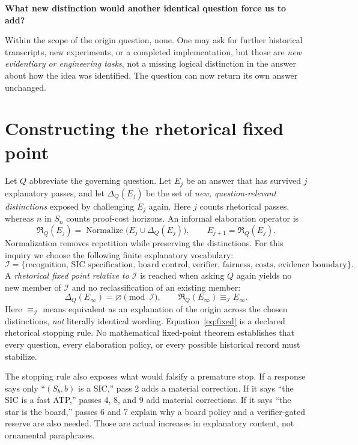 \documentclass[11pt,letterpaper]{article}
\newcommand{\qline}[2]{\medskip\noindent{\color{accent}\textbf{Pass #1.}}\quad\textbf{#2}\par}
\begin{document}
\qline{12}{What new distinction would another identical question force us to add?}
Within the scope of the origin question, none. One may ask for further historical transcripts, new experiments, or a completed implementation, but those are \emph{new evidentiary or engineering tasks}, not a missing logical distinction in the answer about how the idea was identified. The question can now return its own answer unchanged.

\section{Constructing the rhetorical fixed point}
Let $Q$ abbreviate the governing question. Let $E_j$ be an answer that has survived $j$ explanatory passes, and let $\Delta_Q(E_j)$ be the set of \emph{new, question-relevant distinctions} exposed by challenging $E_j$ again. Here $j$ counts rhetorical passes, whereas $n$ in $S_n$ counts proof-cost horizons. An informal elaboration operator is
\begin{equation}\label{eq:operator}
\mathfrak R_Q(E_j)=\operatorname{Normalize}\bigl(E_j\cup\Delta_Q(E_j)\bigr),
\qquad E_{j+1}=\mathfrak R_Q(E_j).
\end{equation}
Normalization removes repetition while preserving the distinctions. For this inquiry we choose the following finite explanatory vocabulary:
\[
\mathcal I=\{\text{recognition, SIC specification, board control,}\
\text{verifier, fairness, costs, evidence boundary}\}.
\]
A \emph{rhetorical fixed point relative to $\mathcal I$} is reached when asking $Q$ again yields no new member of $\mathcal I$ and no reclassification of an existing member:
\begin{equation}\label{eq:fixed}
\boxed{\Delta_Q(E_{\infty})=\varnothing\pmod{\mathcal I},\qquad
\mathfrak R_Q(E_{\infty})\equiv_{\mathcal I}E_{\infty}.}
\end{equation}
Here $\equiv_{\mathcal I}$ means equivalent as an explanation of the origin across the chosen distinctions, \emph{not} literally identical wording. Equation~\eqref{eq:fixed} is a declared rhetorical stopping rule. No mathematical fixed-point theorem establishes that every question, every elaboration policy, or every possible historical record must stabilize.

The stopping rule also exposes what would falsify a premature stop. If a response says only ``$(S_b,b)$ is a SIC,'' pass 2 adds a material correction. If it says ``the SIC is a fast ATP,'' passes 4, 8, and 9 add material corrections. If it says ``the star is the board,'' passes 6 and 7 explain why a board policy and a verifier-gated reserve are also needed. Those are actual increases in explanatory content, not ornamental paraphrases.
\end{document}
